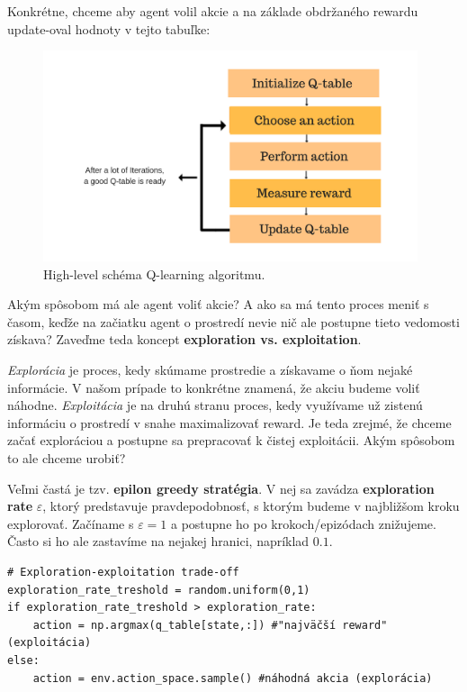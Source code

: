 \documentclass[letterpaper,12pt]{article}
\begin{document}
\noindent Konkrétne, chceme aby agent volil akcie a na základe obdržaného rewardu update-oval hodnoty v tejto tabuľke:
\begin{figure}[H]
\centering
\includegraphics[width=11cm]{images/q-learning-scheme.png}
\caption{High-level schéma Q-learning algoritmu.}
\end{figure}

Akým spôsobom má ale agent voliť akcie? A ako sa má tento proces meniť s časom, keďže na začiatku agent o prostredí nevie nič ale postupne tieto vedomosti získava? Zaveďme teda koncept \textbf{exploration vs. exploitation}.

\textit{Explorácia} je proces, kedy skúmame prostredie a získavame o ňom nejaké informácie. V našom prípade to konkrétne znamená, že akciu budeme voliť náhodne. \textit{Exploitácia} je na druhú stranu proces, kedy využívame už zistenú informáciu o prostredí v snahe maximalizovať reward. Je teda zrejmé, že chceme začať exploráciou a postupne sa prepracovať k čistej exploitácii. Akým spôsobom to ale chceme urobiť?

Veľmi častá je tzv. \textbf{epilon greedy stratégia}. V nej sa zavádza \textbf{exploration rate} {\boldmath $\varepsilon$}, ktorý predstavuje pravdepodobnosť, s ktorým budeme v najbližšom kroku explorovať. Začíname s $\varepsilon = 1$ a postupne ho po krokoch/epizódach znižujeme. Často si ho ale zastavíme na nejakej hranici, napríklad $0.1$.
\vspace{0.4cm}
\begin{verbatim}
# Exploration-exploitation trade-off
exploration_rate_treshold = random.uniform(0,1)
if exploration_rate_treshold > exploration_rate:
    action = np.argmax(q_table[state,:]) #"najväčší reward" (exploitácia)
else:
    action = env.action_space.sample() #náhodná akcia (explorácia)
\end{verbatim}
\vspace{0.3cm}
\end{document}
